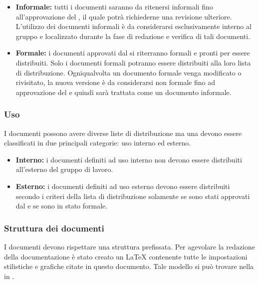 \documentclass[12pt,a4paper]{article}
\begin{document}
\begin{itemize}
	\item \textbf{Informale:} tutti i documenti saranno da ritenersi informali fino all'approvazione del \PM, il quale potrà richiederne una revisione ulteriore. L'utilizzo dei documenti informali è da considerarsi esclusivamente interno al gruppo e localizzato durante la fase di redazione e verifica di tali documenti.
	\item \textbf{Formale:} i documenti approvati dal \PM{} si riterranno formali e pronti per essere distribuiti. Solo i documenti formali potranno essere distribuiti alla loro lista di distribuzione. Ogniqualvolta un documento formale venga modificato o rivisitato, la nuova versione è da considerarsi non formale fino ad approvazione del \PM e quindi sarà trattata come un documento informale.
\end{itemize}

\subsubsection{Uso}
I documenti possono avere diverse liste di distribuzione ma una devono essere classificati in due principali categorie: uso interno ed esterno.

\begin{itemize}
	\item \textbf{Interno:} i documenti definiti ad uso interno non devono essere distribuiti all'esterno del gruppo di lavoro.
	\item \textbf{Esterno:} i documenti definiti ad uso esterno devono essere distribuiti secondo i criteri della lista di distribuzione solamente se sono stati approvati dal \PM{} e se sono in stato formale.  
\end{itemize}

\subsubsection{Struttura dei documenti}
I documenti devono rispettare una struttura prefissata. Per agevolare la redazione della documentazione è stato creato un  \LaTeX{} contenente tutte le impostazioni stilistiche e grafiche citate in questo documento. Tale modello si può trovare nella  in .
\end{document}
